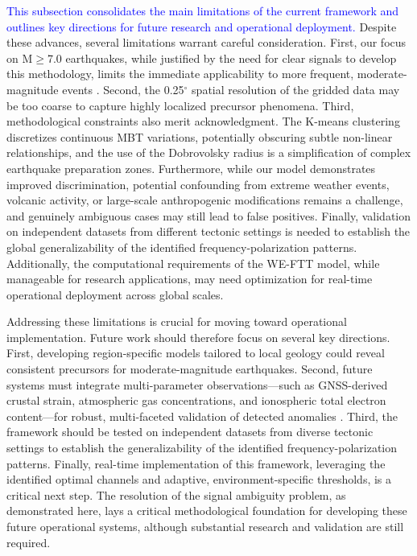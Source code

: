 \documentclass[preprint,review,12pt,authoryear]{elsarticle}
\providecommand{\DIFaddtex}[1]{{\sf #1}} %
\providecommand{\DIFaddbegin}{} %
\providecommand{\DIFaddend}{} %
\providecommand{\DIFdelend}{} %
\providecommand{\DIFadd}[1]{\texorpdfstring{\DIFaddtex{#1}}{#1}} %
\newcommand{\DIFaddincludegraphics}[2][]{{\color{blue}\fbox{\DIFOincludegraphics[#1]{#2}}}} %
\DeclareRobustCommand{\DIFaddbegin}{\DIFOaddbegin \let\includegraphics\DIFaddincludegraphics} %
\DeclareRobustCommand{\DIFaddend}{\DIFOaddend \let\includegraphics\DIFOincludegraphics} %
\DeclareRobustCommand{\DIFdelend}{\DIFOaddend \let\includegraphics\DIFOincludegraphics} %
\renewcommand{\DIFaddtex}[1]{\textcolor{blue}{#1}}
\begin{document}
\DIFdelend \DIFaddbegin \DIFadd{This subsection consolidates the main limitations of the current framework and outlines key directions for future research and operational deployment. }\DIFaddend Despite these advances, several limitations warrant careful consideration. First, our focus on M$\ge$7.0 earthquakes, while justified by the need for clear signals to develop this methodology, limits the immediate applicability to more frequent, moderate-magnitude events \citep{jingLandAtmosphereMeteorological2019}. Second, the 0.25$^{\circ}$ spatial resolution of the gridded data may be too coarse to capture highly localized precursor phenomena. Third, methodological constraints also merit acknowledgment. The K-means clustering discretizes continuous MBT variations, potentially obscuring subtle non-linear relationships, and the use of the Dobrovolsky radius is a simplification of complex earthquake preparation zones. Furthermore, while our model demonstrates improved discrimination, potential confounding from extreme weather events, volcanic activity, or large-scale anthropogenic modifications remains a challenge, and genuinely ambiguous cases may still lead to false positives. Finally, validation on independent datasets from different tectonic settings is needed to establish the global generalizability of the identified frequency-polarization patterns. Additionally, the computational requirements of the WE-FTT model, while manageable for research applications, may need optimization for real-time operational deployment across global scales.


Addressing these limitations is crucial for moving toward operational implementation. Future work should therefore focus on several key directions. First, developing region-specific models tailored to local geology could reveal consistent precursors for moderate-magnitude earthquakes. Second, future systems must integrate multi-parameter observations---such as GNSS-derived crustal strain, atmospheric gas concentrations, and ionospheric total electron content---for robust, multi-faceted validation of detected anomalies \citep{hayakawaIntegratedAnalysisMultiParameter2024}. Third, the framework should be tested on independent datasets from diverse tectonic settings to establish the generalizability of the identified frequency-polarization patterns. Finally, real-time implementation of this framework, leveraging the identified optimal channels and adaptive, environment-specific thresholds, is a critical next step. The resolution of the signal ambiguity problem, as demonstrated here, lays a critical methodological foundation for developing these future operational systems, although substantial research and validation are still required.
\end{document}
